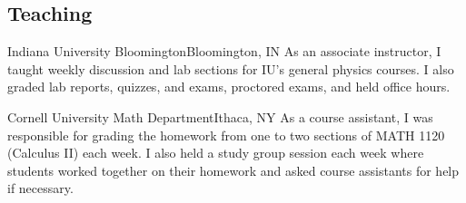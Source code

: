 \documentclass[11pt,a4paper,sans]{moderncv}        %
\begin{document}
\subsection{Teaching}

{Indiana University Bloomington}{Bloomington, IN}{}{
\hspace*{1em}
As an associate instructor, I taught weekly discussion and lab sections for IU's general physics courses.
I also graded lab reports, quizzes, and exams, proctored exams, and held office hours.
}

{Cornell University Math Department}{Ithaca, NY}{}{
\hspace*{1em}
  As a course assistant, I was responsible for grading the homework from one to two sections of MATH 1120 (Calculus II) each week.
I also held a study group session each week where students worked together on their homework and asked course assistants for help if necessary.
}


% 
% 
\end{document}
